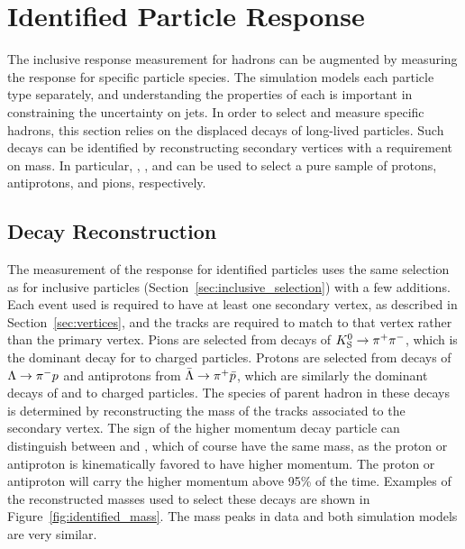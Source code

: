 
\section{Identified Particle Response}
\label{sec:identified}

The inclusive response measurement for hadrons can be augmented by measuring the response for specific particle species. 
The simulation models each particle type separately, and understanding the properties of each is important in constraining the uncertainty on jets. 
In order to select and measure specific hadrons, this section relies on the displaced decays of long-lived particles. 
Such decays can be identified by reconstructing secondary vertices with a requirement on mass.
In particular, \pL, \pLB, and \pKS can be used to select a pure sample of protons, antiprotons, and pions, respectively. 

\subsection{Decay Reconstruction}
The measurement of the response for identified particles uses the same selection as for inclusive particles (Section~\ref{sec:inclusive_selection}) with a few additions.
Each event used is required to have at least one secondary vertex, as described in Section~\ref{sec:vertices}, and the tracks are required to match to that vertex rather than the primary vertex.
Pions are selected from decays of $K_\text{S}^{0} \rightarrow \pi^+ \pi^-$, which is the dominant decay for \pKS to charged particles.
Protons are selected from decays of $\Lambda \rightarrow \pi^- p$ and antiprotons from $\bar{\Lambda} \rightarrow \pi^+ \bar{p}$, which are similarly the dominant decays of \pL and \pLB to charged particles.
The species of parent hadron in these decays is determined by reconstructing the mass of the tracks associated to the secondary vertex.
The sign of the higher momentum decay particle can distinguish between \pL and \pLB, which of course have the same mass, as the proton or antiproton is kinematically favored to have higher momentum.
The proton or antiproton will carry the higher momentum above 95\% of the time.
Examples of the reconstructed masses used to select these decays are shown in Figure~\ref{fig:identified_mass}. 
The mass peaks in data and both simulation models are very similar.


